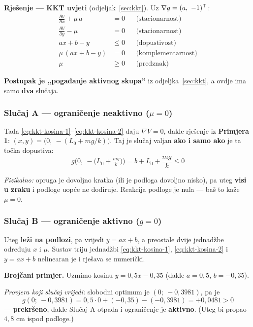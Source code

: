 \textbf{Rješenje --- KKT uvjeti} (odjeljak~\ref{sec:kkt}). Uz
$\nabla g = (a,\ -1)^{\top}$:
\begin{align}
\frac{\partial V}{\partial x} + \mu\,a &= 0 && \text{(stacionarnost)}
  \label{eq:kkt-kosina-1}\\
\frac{\partial V}{\partial y} - \mu &= 0 && \text{(stacionarnost)}
  \label{eq:kkt-kosina-2}\\
ax + b - y &\le 0 && \text{(dopustivost)} \\
\mu\,(ax + b - y) &= 0 && \text{(komplementarnost)} \\
\mu &\ge 0 && \text{(predznak)}
\end{align}

\textbf{Postupak je „pogađanje aktivnog skupa”} iz odjeljka~\ref{sec:kkt}, a
ovdje ima samo \textbf{dva} slučaja.

\subsubsection*{Slučaj A --- ograničenje neaktivno ($\mu = 0$)}

Tada \eqref{eq:kkt-kosina-1}--\eqref{eq:kkt-kosina-2} daju $\nabla V = 0$,
dakle rješenje iz \textbf{Primjera 1}:
$(x,y) = \big(0,\ -(L_0 + mg/k)\big)$. Taj je slučaj valjan \textbf{ako i samo
ako} je ta točka dopustiva:
\[
g\Big(0,\ -\big(L_0 + \tfrac{mg}{k}\big)\Big)
= b + L_0 + \frac{mg}{k} \le 0
\]

\emph{Fizikalno:} opruga je dovoljno kratka (ili je podloga dovoljno nisko), pa
uteg \textbf{visi u zraku} i podloge uopće ne dodiruje. Reakcija podloge je
nula --- baš to kaže $\mu = 0$.

\subsubsection*{Slučaj B --- ograničenje aktivno ($g = 0$)}

Uteg \textbf{leži na podlozi}, pa vrijedi $y = ax + b$, a preostale dvije
jednadžbe određuju $x$ i $\mu$. Sustav triju jednadžbi
\eqref{eq:kkt-kosina-1}, \eqref{eq:kkt-kosina-2} i $y = ax+b$ nelinearan je i
rješava se numerički.

\textbf{Brojčani primjer.} Uzmimo kosinu $y = 0{,}5x - 0{,}35$ (dakle
$a = 0{,}5$, $b = -0{,}35$).

\emph{Provjera koji slučaj vrijedi:} slobodni optimum je
$(0;\ -0{,}3981)$, pa je
\[
g(0;\ -0{,}3981) = 0{,}5\cdot0 + (-0{,}35) - (-0{,}3981) = +0{,}0481 > 0
\]
--- \textbf{prekršeno}, dakle Slučaj A otpada i ograničenje je
\textbf{aktivno}. (Uteg bi propao $4{,}8$ cm ispod podloge.)

